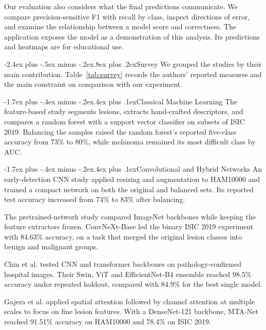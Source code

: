 \documentclass[11pt,a4paper]{article}
\makeatletter
\renewcommand\section{\@startsection{section}{1}{\z@}%
  {-2.4ex plus -.5ex minus -.2ex}{.8ex plus .2ex}{\sffamily\Large\bfseries\color{teal}}}
\renewcommand\subsection{\@startsection{subsection}{2}{\z@}%
  {-1.7ex plus -.4ex minus -.2ex}{.4ex plus .1ex}{\sffamily\normalsize\bfseries}}
\makeatother
\begin{document}
Our evaluation also considers what the final predictions communicate. We compare precision-sensitive F1 with recall by class, inspect directions of error, and examine the relationship between a model score and correctness. The application exposes the model as a demonstration of this analysis. Its predictions and heatmaps are for educational use.

\clearpage
\section{Survey}
\begingroup
\small
\setlength{\parskip}{4pt}
We grouped the studies by their main contribution. Table~\ref{tab:survey} records the authors' reported measures and the main constraint on comparison with our experiment.

\subsection{Classical Machine Learning}
The feature-based study \citep{surveyFeatures} segments lesions, extracts hand-crafted descriptors, and compares a random forest with a support vector classifier on subsets of ISIC 2019. Balancing the samples raised the random forest's reported five-class accuracy from 73\% to 80\%, while melanoma remained its most difficult class by AUC.

\subsection{Convolutional and Hybrid Networks}
An early-detection CNN study \citep{surveyEarlyCNN} applied resizing and augmentation to HAM10000 and trained a compact network on both the original and balanced sets. Its reported test accuracy increased from 74\% to 83\% after balancing.

The pretrained-network study \citep{surveyPretrained} compared ImageNet backbones while keeping the feature extractors frozen. ConvNeXt-Base led the binary ISIC 2019 experiment with 84.63\% accuracy, on a task that merged the original lesion classes into benign and malignant groups.

Chiu et al. \citep{surveyChiu} tested CNN and transformer backbones on pathology-confirmed hospital images. Their Swin, ViT and EfficientNet-B4 ensemble reached 98.5\% accuracy under repeated holdout, compared with 84.9\% for the best single model.

Gajera et al. \citep{surveyGajera} applied spatial attention followed by channel attention at multiple scales to focus on fine lesion features. With a DenseNet-121 backbone, MTA-Net reached 91.51\% accuracy on HAM10000 and 78.4\% on ISIC 2019.
\end{document}
